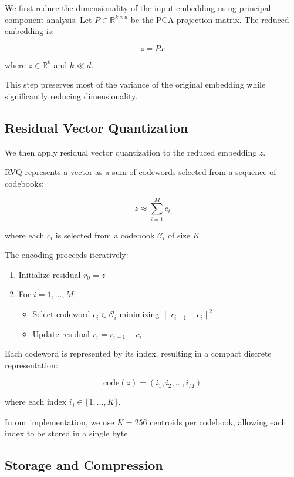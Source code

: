 \documentclass{article}
\begin{document}
We first reduce the dimensionality of the input embedding using principal component analysis. Let $P \in \mathbb{R}^{k \times d}$ be the PCA projection matrix. The reduced embedding is:

\[
z = P x
\]

where $z \in \mathbb{R}^k$ and $k \ll d$.

This step preserves most of the variance of the original embedding while significantly reducing dimensionality.

\subsection{Residual Vector Quantization}

We then apply residual vector quantization to the reduced embedding $z$.

RVQ represents a vector as a sum of codewords selected from a sequence of codebooks:

\[
z \approx \sum_{i=1}^{M} c_i
\]

where each $c_i$ is selected from a codebook $\mathcal{C}_i$ of size $K$.

The encoding proceeds iteratively:

\begin{enumerate}
    \item Initialize residual $r_0 = z$
    \item For $i = 1, \dots, M$:
    \begin{itemize}
        \item Select codeword $c_i \in \mathcal{C}_i$ minimizing $\|r_{i-1} - c_i\|^2$
        \item Update residual $r_i = r_{i-1} - c_i$
    \end{itemize}
\end{enumerate}

Each codeword is represented by its index, resulting in a compact discrete representation:

\[
\text{code}(z) = (i_1, i_2, \dots, i_M)
\]

where each index $i_j \in \{1, \dots, K\}$.

In our implementation, we use $K = 256$ centroids per codebook, allowing each index to be stored in a single byte.

\subsection{Storage and Compression}
\end{document}
